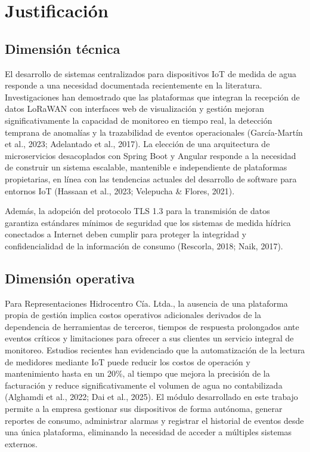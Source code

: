 \documentclass[12pt,a4paper,oneside]{report}
\begin{document}
\section{Justificación}

\subsection*{Dimensión técnica}

El desarrollo de sistemas centralizados para dispositivos IoT de medida de agua responde a una necesidad documentada recientemente en la literatura. Investigaciones han demostrado que las plataformas que integran la recepción de datos LoRaWAN con interfaces web de visualización y gestión mejoran significativamente la capacidad de monitoreo en tiempo real, la detección temprana de anomalías y la trazabilidad de eventos operacionales (García-Martín et al., 2023; Adelantado et al., 2017). La elección de una arquitectura de microservicios desacoplados con Spring Boot y Angular responde a la necesidad de construir un sistema escalable, mantenible e independiente de plataformas propietarias, en línea con las tendencias actuales del desarrollo de software para entornos IoT (Hassaan et al., 2023; Velepucha \& Flores, 2021).

Además, la adopción del protocolo TLS 1.3 para la transmisión de datos garantiza estándares mínimos de seguridad que los sistemas de medida hídrica conectados a Internet deben cumplir para proteger la integridad y confidencialidad de la información de consumo (Rescorla, 2018; Naik, 2017).

\subsection*{Dimensión operativa}

Para Representaciones Hidrocentro Cía. Ltda., la ausencia de una plataforma propia de gestión implica costos operativos adicionales derivados de la dependencia de herramientas de terceros, tiempos de respuesta prolongados ante eventos críticos y limitaciones para ofrecer a sus clientes un servicio integral de monitoreo. Estudios recientes han evidenciado que la automatización de la lectura de medidores mediante IoT puede reducir los costos de operación y mantenimiento hasta en un 20\%, al tiempo que mejora la precisión de la facturación y reduce significativamente el volumen de agua no contabilizada (Alghamdi et al., 2022; Dai et al., 2025). El módulo desarrollado en este trabajo permite a la empresa gestionar sus dispositivos de forma autónoma, generar reportes de consumo, administrar alarmas y registrar el historial de eventos desde una única plataforma, eliminando la necesidad de acceder a múltiples sistemas externos.
\end{document}
